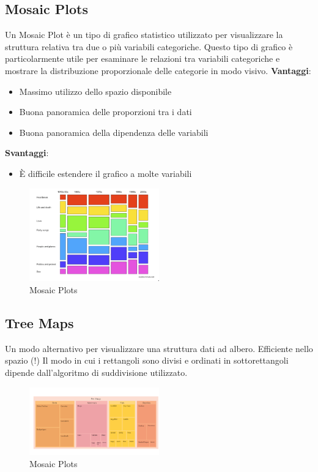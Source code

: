 \subsection{Mosaic Plots}

Un Mosaic Plot è un tipo di grafico statistico utilizzato per visualizzare la struttura relativa tra due o più variabili categoriche. Questo tipo di grafico è particolarmente utile per esaminare le relazioni tra variabili categoriche e mostrare la distribuzione proporzionale delle categorie in modo visivo.
\textbf{Vantaggi}:
\begin{itemize}
  \item Massimo utilizzo dello spazio disponibile
  \item Buona panoramica delle proporzioni tra i dati
  \item Buona panoramica della dipendenza delle variabili
\end{itemize}

\textbf{Svantaggi}:
\begin{itemize}
  \item È difficile estendere il grafico a molte variabili
\end{itemize}
\begin{figure}[H]
  \centering
  \includegraphics[width=0.5\textwidth]{images/MosaicPlots.png} 
  \caption{Mosaic Plots}
  \label{fig:immagine}
\end{figure}
\subsection{Tree Maps}
Un modo alternativo per visualizzare una struttura dati ad albero.
Efficiente nello spazio (!)
Il modo in cui i rettangoli sono divisi e ordinati in sottorettangoli dipende dall'algoritmo di suddivisione utilizzato.
\begin{figure}[H]
  \centering
  \includegraphics[width=0.5\textwidth]{images/TreeMaps.png} 
  \caption{Mosaic Plots}
  \label{fig:immagine}
\end{figure}

